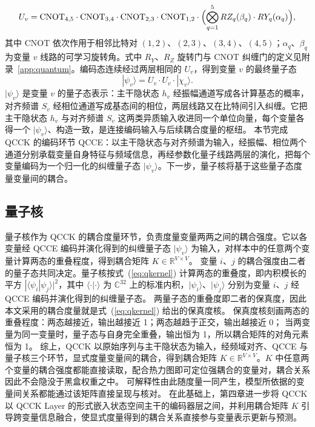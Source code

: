 \begin{equation}
\label{eq:circuit}
U_v = \mathrm{CNOT}_{4,5}\cdot\mathrm{CNOT}_{3,4}\cdot\mathrm{CNOT}_{2,3}\cdot\mathrm{CNOT}_{1,2} \cdot \Bigl(\bigotimes_{q=1}^{5} RZ_q(\beta_q)\cdot RY_q(\alpha_q)\Bigr),
\end{equation}
其中 CNOT 依次作用于相邻比特对 $(1,2)$、$(2,3)$、$(3,4)$、$(4,5)$；$\alpha_q$、$\beta_q$ 为变量 $v$ 线路的可学习旋转角。式中 $R_Y$、$R_Z$ 旋转门与 CNOT 纠缠门的定义见附录~\ref{app:quantum}。编码态连续经过两层相同的 $U_v$，得到变量 $v$ 的最终量子态
\begin{equation}
\label{eq:final-state}
|\psi_v\rangle = U_v\cdot U_v\cdot|\chi_v\rangle.
\end{equation}
$|\psi_v\rangle$ 是变量 $v$ 的量子态表示：主干隐状态 $h_v$ 经振幅通道写成各计算基态的概率，对齐频谱 $S_v$ 经相位通道写成基态间的相位，两层线路又在比特间引入纠缠。它把主干隐状态 $h_v$ 与对齐频谱 $S_v$ 这两类异质输入收进同一个单位向量，每个变量各得一个 $|\psi_v\rangle$、构造一致，是连接编码输入与后续耦合度量的枢纽。
本节完成 QCCK 的编码环节 QCCE：以主干隐状态与对齐频谱为输入，经振幅、相位两个通道分别承载变量自身特征与频域信息，再经参数化量子线路两层的演化，把每个变量编码为一个归一化的纠缠量子态 $|\psi_v\rangle$。下一步，量子核将基于这些量子态度量变量间的耦合。

\subsection{量子核}

量子核作为 QCCK 的耦合度量环节，负责度量变量两两之间的耦合强度。它以各变量经 QCCE 编码并演化得到的纠缠量子态 $|\psi_v\rangle$ 为输入，对样本中的任意两个变量计算两态的重叠程度，得到耦合矩阵 $K\in\mathbb{R}^{V\times V}$。
变量 $i$、$j$ 的耦合强度由二者的量子态共同决定。量子核按式~(\ref{eq:qkernel}) 计算两态的重叠度，即内积模长的平方 $|\langle\psi_i|\psi_j\rangle|^2$，其中 $\langle\cdot|\cdot\rangle$ 为 $\mathbb{C}^{32}$ 上的标准内积，$|\psi_i\rangle$、$|\psi_j\rangle$ 分别为变量 $i$、$j$ 经 QCCE 编码并演化得到的纠缠量子态。
两量子态的重叠度即二者的保真度，因此本文采用的耦合度量就是式~(\ref{eq:qkernel}) 给出的保真度核。
保真度核刻画两态的重叠程度：两态越接近，输出越接近 1；两态越趋于正交，输出越接近 0；
当两变量为同一变量时，量子态与自身完全重叠，输出恒为 1，所以耦合矩阵的对角元素恒为 1。
综上，QCCK 以原始序列与主干隐状态为输入，经频域对齐、QCCE 与量子核三个环节，显式度量变量间的耦合，得到耦合矩阵 $K\in\mathbb{R}^{V\times V}$。$K$ 中任意两个变量的耦合强度都能直接读取，配合热力图即可定位强耦合的变量对，耦合关系因此不会隐没于黑盒权重之中。
可解释性由此随度量一同产生，模型所依据的变量间关系都能通过该矩阵直接呈现与核对。
在此基础上，第四章进一步将 QCCK 以 QCCK Layer 的形式嵌入状态空间主干的编码器层之间，并利用耦合矩阵 $K$ 引导跨变量信息融合，使显式度量得到的耦合关系直接参与变量表示更新与预测。



